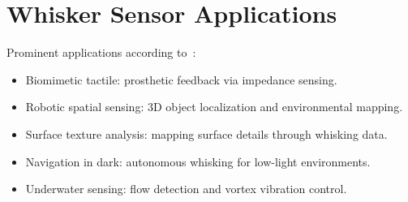 \section{Whisker Sensor Applications}

Prominent applications according to~\cite{s22072705}:
\begin{itemize}
    \item Biomimetic tactile: prosthetic feedback via impedance sensing.
    \item Robotic spatial sensing: 3D object localization and environmental mapping.
    \item Surface texture analysis: mapping surface details through whisking data.
    \item Navigation in dark: autonomous whisking for low-light environments.
    \item Underwater sensing: flow detection and vortex vibration control.
\end{itemize}

